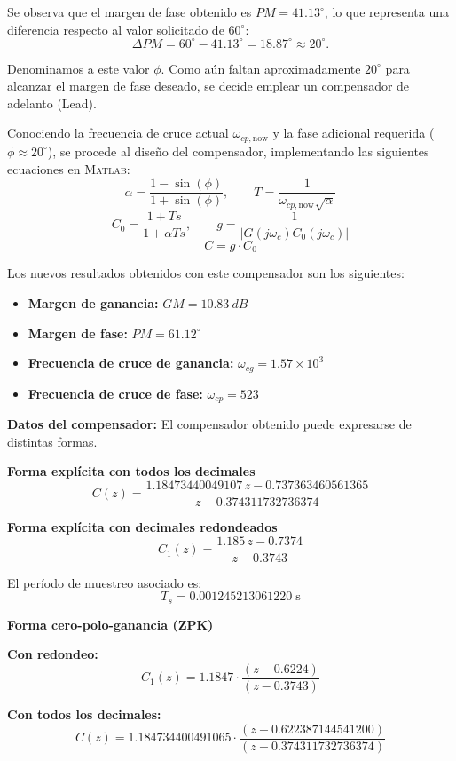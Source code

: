 Se observa que el margen de fase obtenido es $PM = 41.13^\circ$, lo que representa una diferencia respecto al valor solicitado de $60^\circ$:
\[
\Delta PM = 60^\circ - 41.13^\circ = 18.87^\circ \approx 20^\circ.
\]

Denominamos a este valor $\phi$. Como aún faltan aproximadamente $20^\circ$ para alcanzar el margen de fase deseado, se decide emplear un compensador de adelanto (Lead).  

Conociendo la frecuencia de cruce actual $\omega_{cp,\text{now}}$ y la fase adicional requerida ($\phi \approx 20^\circ$), se procede al diseño del compensador, implementando las siguientes ecuaciones en \textsc{Matlab}:
\[
\alpha = \frac{1 - \sin(\phi)}{1 + \sin(\phi)}, 
\qquad 
T = \frac{1}{\omega_{cp,\text{now}} \sqrt{\alpha}} 
\]
\[
C_0 = \frac{1 + T s}{1 + \alpha T s}, 
\qquad 
g = \frac{1}{\left| G(j\omega_c) C_0(j\omega_c) \right|}
\]
\[
C = g \cdot C_0
\]


Los nuevos resultados obtenidos con este compensador son los siguientes:
\begin{itemize}
	\item \textbf{Margen de ganancia:} $GM = \SI{10.83}{dB}$
	\item \textbf{Margen de fase:} $PM = 61.12^\circ$
	\item \textbf{Frecuencia de cruce de ganancia:} $\omega_{cg} = 1.57 \times 10^3$
	\item \textbf{Frecuencia de cruce de fase:} $\omega_{cp} = 523$
\end{itemize}

\textbf{Datos del compensador:} El compensador obtenido puede expresarse de distintas formas.  

\textbf{Forma explícita con todos los decimales}  
\[
C(z) = \frac{1.18473440049107 \, z - 0.737363460561365}{z - 0.374311732736374}
\]

\textbf{Forma explícita con decimales redondeados}  
\[
C_1(z) = \frac{1.185 \, z - 0.7374}{z - 0.3743}
\]

El período de muestreo asociado es:
\[
T_s = 0.001245213061220 \; \text{s}
\]

\textbf{Forma cero-polo-ganancia (ZPK)}

\textbf{Con redondeo:}  
\[
C_1(z) = 1.1847 \cdot \frac{(z - 0.6224)}{(z - 0.3743)}
\]

\textbf{Con todos los decimales:}  
\[
C(z) = 1.184734400491065 \cdot \frac{(z - 0.622387144541200)}{(z - 0.374311732736374)}
\]

